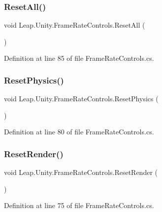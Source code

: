 \subsubsection{\texorpdfstring{ResetAll()}{ResetAll()}}
{\footnotesize\ttfamily void Leap.\+Unity.\+Frame\+Rate\+Controls.\+Reset\+All (\begin{DoxyParamCaption}{ }\end{DoxyParamCaption})}



Definition at line 85 of file Frame\+Rate\+Controls.\+cs.

\mbox{\label{class_leap_1_1_unity_1_1_frame_rate_controls_a6dc62680fcbd63148da9ffb4c8a96907}} 
\subsubsection{\texorpdfstring{ResetPhysics()}{ResetPhysics()}}
{\footnotesize\ttfamily void Leap.\+Unity.\+Frame\+Rate\+Controls.\+Reset\+Physics (\begin{DoxyParamCaption}{ }\end{DoxyParamCaption})}



Definition at line 80 of file Frame\+Rate\+Controls.\+cs.

\mbox{\label{class_leap_1_1_unity_1_1_frame_rate_controls_a6125da967c18fa39cd9440369460162c}} 
\subsubsection{\texorpdfstring{ResetRender()}{ResetRender()}}
{\footnotesize\ttfamily void Leap.\+Unity.\+Frame\+Rate\+Controls.\+Reset\+Render (\begin{DoxyParamCaption}{ }\end{DoxyParamCaption})}



Definition at line 75 of file Frame\+Rate\+Controls.\+cs.



